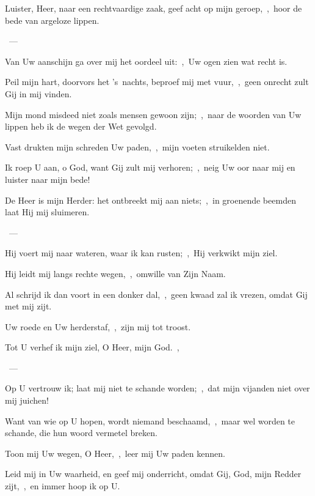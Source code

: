 \documentclass[12pt,twoside,a5paper]{article}
\begin{document}
\begin{halfparskip}
  Luister, Heer, naar een rechtvaardige zaak, geef acht op mijn geroep,~\sep\ hoor de bede van argeloze lippen.

  ~--- 

  Van Uw aanschijn ga over mij het oordeel uit:~\sep\ Uw ogen zien wat recht is.

  Peil mijn hart, doorvors het 's~nachts, beproef mij met vuur,~\sep\ geen onrecht zult Gij in mij vinden.

  Mijn mond misdeed niet zoals mensen gewoon zijn;~\sep\ naar de woorden van Uw lippen heb ik de wegen der Wet gevolgd.

  Vast drukten mijn schreden Uw paden,~\sep\ mijn voeten struikelden niet.

  Ik roep U aan, o God, want Gij zult mij verhoren;~\sep\ neig Uw oor naar mij en luister naar mijn bede!
\end{halfparskip}

\begin{halfparskip}
   
\end{halfparskip}

\begin{halfparskip}
  De Heer is mijn Herder: het ontbreekt mij aan niets;~\sep\ in groenende beemden laat Hij mij sluimeren.

  ~--- 

  Hij voert mij naar wateren, waar ik kan rusten;~\sep\ Hij verkwikt mijn ziel.

  Hij leidt mij langs rechte wegen,~\sep\ omwille van Zijn Naam.

  Al schrijd ik dan voort in een donker dal,~\sep\ geen kwaad zal ik vrezen, omdat Gij met mij zijt.

  Uw roede en Uw herderstaf,~\sep\ zijn mij tot troost.
\end{halfparskip}

\begin{halfparskip}
   
\end{halfparskip}

\begin{halfparskip}
  Tot U verhef ik mijn ziel, O Heer, mijn God.~\sep

  ~--- 

  Op U vertrouw ik; laat mij niet te schande worden;~\sep\ dat mijn vijanden niet over mij juichen!

  Want van wie op U hopen, wordt niemand beschaamd,~\sep\ maar wel worden te schande, die hun woord vermetel breken.

  Toon mij Uw wegen, O Heer,~\sep\ leer mij Uw paden kennen.

  Leid mij in Uw waarheid, en geef mij onderricht, omdat Gij, God, mijn Redder zijt,~\sep\ en immer hoop ik op U.
\end{halfparskip}
\end{document}
